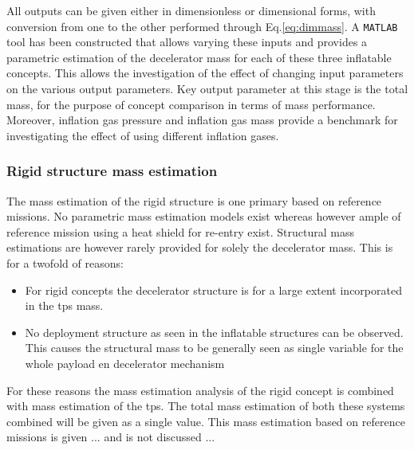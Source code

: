 All outputs can be given either in dimensionless or dimensional forms, with conversion from one to the other performed through Eq.\ref{eq:dimmass}. A \texttt{MATLAB} tool has been constructed that allows varying these inputs and provides a parametric estimation of the decelerator mass for each of these three inflatable concepts. This allows the investigation of the effect of changing input parameters on the various output parameters. Key output parameter at this stage is the total mass, for the purpose of concept comparison in terms of mass performance. Moreover, inflation gas pressure and inflation gas mass provide a benchmark for investigating the effect of using different inflation gases.


\subsubsection{Rigid structure mass estimation}

The mass estimation of the rigid structure is one primary based on reference missions. No parametric mass estimation models exist whereas however ample of reference mission using a heat shield for re-entry exist. Structural mass estimations are however rarely provided for solely the decelerator mass. This is for a twofold of reasons:

\begin{itemize}
\item For rigid concepts the decelerator structure is for a large extent incorporated in the \acrfull{tps} mass.
\item No deployment structure as seen in the inflatable structures can be observed. This causes the structural mass to be generally seen as single variable for the whole payload en decelerator mechanism
\end{itemize}

For these reasons the mass estimation analysis of the rigid concept is combined with mass estimation of the \acrfull{tps}. The total mass estimation of both these systems combined will be given as a single value. This mass estimation based on reference missions is given ... and is not discussed ...



